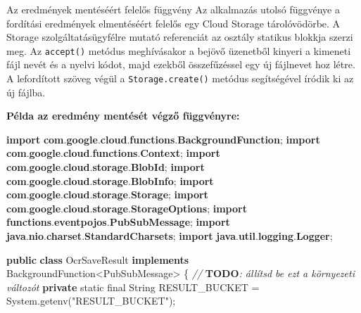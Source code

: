 \documentclass[
]{article}
\newenvironment{Shaded}{}{}
\newcommand{\AlertTok}[1]{\textcolor[rgb]{1.00,0.00,0.00}{\textbf{#1}}}
\newcommand{\BuiltInTok}[1]{\textcolor[rgb]{0.00,0.50,0.00}{#1}}
\newcommand{\CommentTok}[1]{\textcolor[rgb]{0.38,0.63,0.69}{\textit{#1}}}
\newcommand{\DataTypeTok}[1]{\textcolor[rgb]{0.56,0.13,0.00}{#1}}
\newcommand{\FunctionTok}[1]{\textcolor[rgb]{0.02,0.16,0.49}{#1}}
\newcommand{\ImportTok}[1]{\textcolor[rgb]{0.00,0.50,0.00}{\textbf{#1}}}
\newcommand{\KeywordTok}[1]{\textcolor[rgb]{0.00,0.44,0.13}{\textbf{#1}}}
\newcommand{\NormalTok}[1]{#1}
\newcommand{\OperatorTok}[1]{\textcolor[rgb]{0.40,0.40,0.40}{#1}}
\newcommand{\StringTok}[1]{\textcolor[rgb]{0.25,0.44,0.63}{#1}}
\begin{document}
Az eredmények mentéséért felelős függvény Az alkalmazás utolsó függvénye
a fordítási eredmények elmentéséért felelős egy Cloud Storage
tárolóvödörbe. A Storage szolgáltatásügyfélre mutató referenciát az
osztály statikus blokkja szerzi meg. Az \texttt{accept()} metódus
meghívásakor a bejövő üzenetből kinyeri a kimeneti fájl nevét és a
nyelvi kódot, majd ezekből összefűzéssel egy új fájlnevet hoz létre. A
lefordított szöveg végül a \texttt{Storage.create()} metódus
segítségével íródik ki az új fájlba.

\textbf{Példa az eredmény mentését végző függvényre:}

\begin{Shaded}
\begin{Highlighting}[]
\KeywordTok{import} \ImportTok{com}\OperatorTok{.}\ImportTok{google}\OperatorTok{.}\ImportTok{cloud}\OperatorTok{.}\ImportTok{functions}\OperatorTok{.}\ImportTok{BackgroundFunction}\OperatorTok{;}
\KeywordTok{import} \ImportTok{com}\OperatorTok{.}\ImportTok{google}\OperatorTok{.}\ImportTok{cloud}\OperatorTok{.}\ImportTok{functions}\OperatorTok{.}\ImportTok{Context}\OperatorTok{;}
\KeywordTok{import} \ImportTok{com}\OperatorTok{.}\ImportTok{google}\OperatorTok{.}\ImportTok{cloud}\OperatorTok{.}\ImportTok{storage}\OperatorTok{.}\ImportTok{BlobId}\OperatorTok{;}
\KeywordTok{import} \ImportTok{com}\OperatorTok{.}\ImportTok{google}\OperatorTok{.}\ImportTok{cloud}\OperatorTok{.}\ImportTok{storage}\OperatorTok{.}\ImportTok{BlobInfo}\OperatorTok{;}
\KeywordTok{import} \ImportTok{com}\OperatorTok{.}\ImportTok{google}\OperatorTok{.}\ImportTok{cloud}\OperatorTok{.}\ImportTok{storage}\OperatorTok{.}\ImportTok{Storage}\OperatorTok{;}
\KeywordTok{import} \ImportTok{com}\OperatorTok{.}\ImportTok{google}\OperatorTok{.}\ImportTok{cloud}\OperatorTok{.}\ImportTok{storage}\OperatorTok{.}\ImportTok{StorageOptions}\OperatorTok{;}
\KeywordTok{import} \ImportTok{functions}\OperatorTok{.}\ImportTok{eventpojos}\OperatorTok{.}\ImportTok{PubSubMessage}\OperatorTok{;}
\KeywordTok{import} \ImportTok{java}\OperatorTok{.}\ImportTok{nio}\OperatorTok{.}\ImportTok{charset}\OperatorTok{.}\ImportTok{StandardCharsets}\OperatorTok{;}
\KeywordTok{import} \ImportTok{java}\OperatorTok{.}\ImportTok{util}\OperatorTok{.}\ImportTok{logging}\OperatorTok{.}\ImportTok{Logger}\OperatorTok{;}

\KeywordTok{public} \KeywordTok{class}\NormalTok{ OcrSaveResult }\KeywordTok{implements}\NormalTok{ BackgroundFunction}\OperatorTok{\textless{}}\NormalTok{PubSubMessage}\OperatorTok{\textgreater{}} \OperatorTok{\{}
  \CommentTok{// }\AlertTok{TODO}\CommentTok{: állítsd be ezt a környezeti változót}
  \KeywordTok{private} \DataTypeTok{static} \DataTypeTok{final} \BuiltInTok{String}\NormalTok{ RESULT\_BUCKET }\OperatorTok{=} \BuiltInTok{System}\OperatorTok{.}\FunctionTok{getenv}\OperatorTok{(}\StringTok{"RESULT\_BUCKET"}\OperatorTok{);}


\end{Highlighting}
\end{Shaded}
\end{document}

